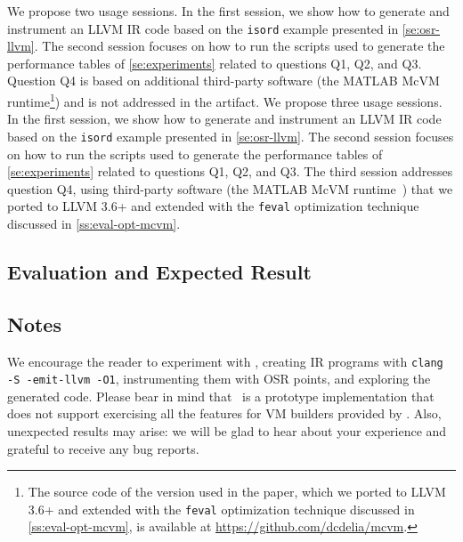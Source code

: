 \ifdefined \nomcvm
We propose two usage sessions. In the first session, we show how to generate and instrument an LLVM IR code based on the \texttt{isord} example presented in \mysection\ref{se:osr-llvm}. The second session focuses on how to run the scripts used to generate the performance tables of \mysection\ref{se:experiments} related to questions Q1, Q2, and Q3. Question Q4 is based on additional third-party software (the MATLAB McVM runtime\footnote{The source code of the version used in the paper, which we ported to LLVM 3.6+ and extended with the {\tt feval} optimization technique discussed in \ref{ss:eval-opt-mcvm}, is available at \url{https://github.com/dcdelia/mcvm}.}) and is not addressed in the artifact.
\else
We propose three usage sessions. In the first session, we show how to generate and instrument an LLVM IR code based on the \texttt{isord} example presented in \mysection\ref{se:osr-llvm}. The second session focuses on how to run the scripts used to generate the performance tables of \mysection\ref{se:experiments} related to questions Q1, Q2, and Q3. The third session addresses question Q4, using third-party software (the MATLAB McVM runtime~\cite{mcvm}) that we ported to LLVM 3.6+ and extended with the {\tt feval} optimization technique discussed in \ref{ss:eval-opt-mcvm}.
\fi

\subsection{Evaluation and Expected Result}
\label{ss:art-eval-res}



\ifdefined \nomcvm
\else

\fi

\subsection{Notes}

We encourage the reader to experiment with \tinyvm, creating IR programs with {\tt clang -S -emit-llvm -O1}, instrumenting them with OSR points, and exploring the generated code. Please bear in mind that \tinyvm\ is a prototype implementation that does not support exercising all the features for VM builders provided by \osrkit.
Also, unexpected results may arise: we will be glad to hear about your experience and grateful to receive any bug reports.




